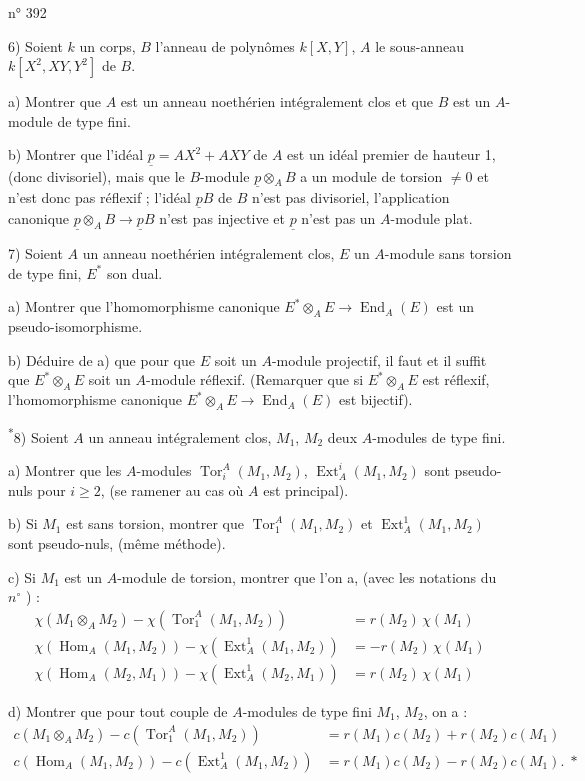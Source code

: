 \hfill n° 392

6) Soient $k$ un corps, $B$ l'anneau de polynômes $k[X,Y]$, $A$ le sous-anneau $k[X^2,XY,Y^2]$ de $B$.

a) Montrer que $A$ est un anneau noethérien intégralement clos et que $B$ est un $A$-module de type fini.

b) Montrer que l'idéal $\underline{p}=AX^2+AXY$ de $A$ est un idéal premier de hauteur 1, (donc divisoriel), mais que le $B$-module $\underline{p}\otimes_A B$ a un module de torsion $\ne 0$ et n'est donc pas réflexif ; l'idéal $\underline{p} B$ de $B$ n'est pas divisoriel, l'application canonique $\underline{p}\otimes_A B\longrightarrow \underline{p} B$ n'est pas injective et $\underline{p}$ n'est pas un $A$-module plat.

7) Soient $A$ un anneau noethérien intégralement clos, $E$ un $A$-module sans torsion de type fini, $E^*$ son dual.

a) Montrer que l'homomorphisme canonique $E^*\otimes_A E\longrightarrow\operatorname{End}_A(E)$ est un pseudo-isomorphisme.

b) Déduire de a) que pour que $E$ soit un $A$-module projectif, il faut et il suffit que $E^*\otimes_A E$ soit un $A$-module réflexif. (Remarquer que si $E^*\otimes_A E$ est réflexif, l'homomorphisme canonique $E^*\otimes_A E\longrightarrow\operatorname{End}_A(E)$ est bijectif).

\textsuperscript{*}8) Soient $A$ un anneau  intégralement clos, $M_1$, $M_2$ deux $A$-modules de type fini.

a) Montrer que les $A$-modules $\operatorname{Tor}_i^A(M_1,M_2)$, $\operatorname{Ext}_A^i(M_1,M_2)$ sont pseudo-nuls pour $i\geq2$, (se ramener au cas où $A$ est principal).

b) Si $M_1$ est sans torsion, montrer que $\operatorname{Tor}_1^A(M_1,M_2)$ et $\operatorname{Ext}_A^1(M_1,M_2)$ sont pseudo-nuls, (même méthode).

c) Si $M_1$ est un $A$-module de torsion, montrer que l'on a, (avec les notations du $n^{\circ}$ \quad) :
\[
\begin{aligned}
\chi(M_1\otimes_A M_2)-\chi(\operatorname{Tor}_1^A(M_1,M_2))&=r(M_2)\,\chi(M_1)\\
\chi(\operatorname{Hom}_A(M_1,M_2))-\chi(\operatorname{Ext}_A^1(M_1,M_2))&=-r(M_2)\,\chi(M_1)\\
\chi(\operatorname{Hom}_A(M_2,M_1))-\chi(\operatorname{Ext}_A^1(M_2,M_1))&=r(M_2)\,\chi(M_1)
\end{aligned}
\]

d) Montrer que pour tout couple de $A$-modules de type fini $M_1$, $M_2$, on a :
\[
\begin{aligned}
c(M_1\otimes_A M_2)-c(\operatorname{Tor}_1^A(M_1,M_2))&=r(M_1)c(M_2)+r(M_2)c(M_1)\\
c(\operatorname{Hom}_A(M_1,M_2))-c(\operatorname{Ext}_A^1(M_1,M_2))&=r(M_1)c(M_2)-r(M_2)c(M_1).\;*
\end{aligned}
\]
